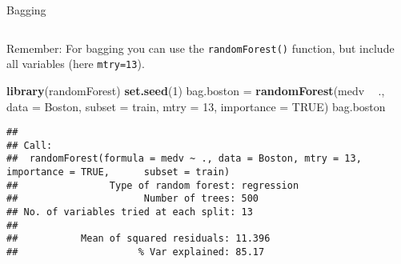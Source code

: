 \documentclass[10pt,ignorenonframetext,]{beamer}
\newenvironment{Shaded}{\begin{snugshade}}{\end{snugshade}}
\newcommand{\DataTypeTok}[1]{\textcolor[rgb]{0.13,0.29,0.53}{#1}}
\newcommand{\DecValTok}[1]{\textcolor[rgb]{0.00,0.00,0.81}{#1}}
\newcommand{\KeywordTok}[1]{\textcolor[rgb]{0.13,0.29,0.53}{\textbf{#1}}}
\newcommand{\NormalTok}[1]{#1}
\newcommand{\OperatorTok}[1]{\textcolor[rgb]{0.81,0.36,0.00}{\textbf{#1}}}
\newcommand{\OtherTok}[1]{\textcolor[rgb]{0.56,0.35,0.01}{#1}}
\newcommand{\StringTok}[1]{\textcolor[rgb]{0.31,0.60,0.02}{#1}}
\begin{document}
\begin{frame}[fragile]

\begin{block}{Bagging}

\(~\)

\small

Remember: For bagging you can use the \texttt{randomForest()} function,
but include all variables (here \texttt{mtry=13}).

\vspace{2mm}

\scriptsize

\begin{Shaded}
\begin{Highlighting}[]
\KeywordTok{library}\NormalTok{(randomForest)}
\KeywordTok{set.seed}\NormalTok{(}\DecValTok{1}\NormalTok{)}
\NormalTok{bag.boston =}\StringTok{ }\KeywordTok{randomForest}\NormalTok{(medv }\OperatorTok{~}\StringTok{ }\NormalTok{., }\DataTypeTok{data =}\NormalTok{ Boston, }\DataTypeTok{subset =}\NormalTok{ train, }\DataTypeTok{mtry =} \DecValTok{13}\NormalTok{, }
    \DataTypeTok{importance =} \OtherTok{TRUE}\NormalTok{)}
\NormalTok{bag.boston}
\end{Highlighting}
\end{Shaded}

\begin{verbatim}
## 
## Call:
##  randomForest(formula = medv ~ ., data = Boston, mtry = 13, importance = TRUE,      subset = train) 
##                Type of random forest: regression
##                      Number of trees: 500
## No. of variables tried at each split: 13
## 
##           Mean of squared residuals: 11.396
##                     % Var explained: 85.17
\end{verbatim}

\end{block}

\end{frame}
\end{document}
